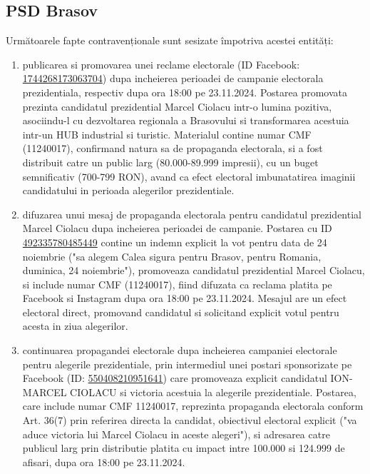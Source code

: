 \documentclass[a4paper,12pt]{article}
\begin{document}
\vspace{0.5cm}

\subsection{PSD Brasov}
Următoarele fapte contravenționale sunt sesizate împotriva acestei entități:

\begin{enumerate}[leftmargin=*, label=\arabic*.)]
    \item publicarea si promovarea unei reclame electorale (ID Facebook: \href{https://www.facebook.com/ads/library/?id=1744268173063704}{1744268173063704}) dupa incheierea perioadei de campanie electorala prezidentiala, respectiv dupa ora 18:00 pe 23.11.2024. Postarea promovata prezinta candidatul prezidential Marcel Ciolacu intr-o lumina pozitiva, asociindu-l cu dezvoltarea regionala a Brasovului si transformarea acestuia intr-un HUB industrial si turistic. Materialul contine numar CMF (11240017), confirmand natura sa de propaganda electorala, si a fost distribuit catre un public larg (80.000-89.999 impresii), cu un buget semnificativ (700-799 RON), avand ca efect electoral imbunatatirea imaginii candidatului in perioada alegerilor prezidentiale.
    \item difuzarea unui mesaj de propaganda electorala pentru candidatul prezidential Marcel Ciolacu dupa incheierea perioadei de campanie. Postarea cu ID \href{https://www.facebook.com/ads/library/?id=492335780485449}{492335780485449} contine un indemn explicit la vot pentru data de 24 noiembrie ("sa alegem Calea sigura pentru Brasov, pentru Romania, duminica, 24 noiembrie"), promoveaza candidatul prezidential Marcel Ciolacu, si include numar CMF (11240017), fiind difuzata ca reclama platita pe Facebook si Instagram dupa ora 18:00 pe 23.11.2024. Mesajul are un efect electoral direct, promovand candidatul si solicitand explicit votul pentru acesta in ziua alegerilor.
    \item continuarea propagandei electorale dupa incheierea campaniei electorale pentru alegerile prezidentiale, prin intermediul unei postari sponsorizate pe Facebook (ID: \href{https://www.facebook.com/ads/library/?id=550408210951641}{550408210951641}) care promoveaza explicit candidatul ION-MARCEL CIOLACU si victoria acestuia la alegerile prezidentiale. Postarea, care include numar CMF 11240017, reprezinta propaganda electorala conform Art. 36(7) prin referirea directa la candidat, obiectivul electoral explicit ("va aduce victoria lui Marcel Ciolacu in aceste alegeri"), si adresarea catre publicul larg prin distributie platita cu impact intre 100.000 si 124.999 de afisari, dupa ora 18:00 pe 23.11.2024.

\end{enumerate}
\end{document}
